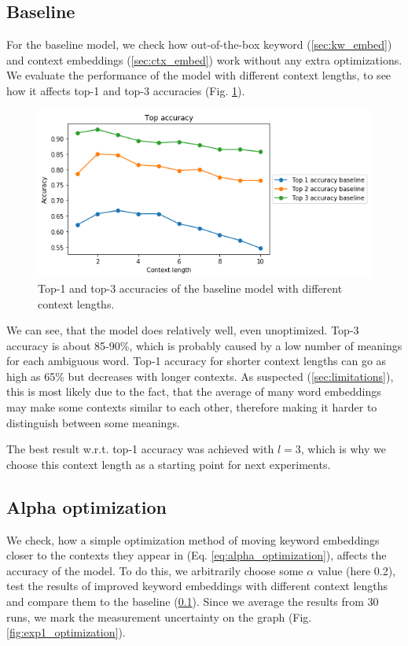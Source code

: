 \documentclass{llncs}
\begin{document}
\subsection{Baseline}
\label{sec:baseline}
For the baseline model, we check how out-of-the-box keyword (\ref{sec:kw_embed}) and context embeddings (\ref{sec:ctx_embed}) work without any extra optimizations.
We evaluate the performance of the model with different context lengths, to see how it affects top-1 and top-3 accuracies (Fig. \ref{fig:baseline}).

\begin{figure}
    \centering
    \caption{Top-1 and top-3 accuracies of the baseline model with different context lengths.}
    \label{fig:baseline}
    \includegraphics[scale=0.7]{res/baseline_context_top_acc.png}
\end{figure}

We can see, that the model does relatively well, even unoptimized.
Top-3 accuracy is about 85-90\%, which is probably caused by a low number of meanings for each ambiguous word.
Top-1 accuracy for shorter context lengths can go as high as 65\% but decreases with longer contexts.
As suspected (\ref{sec:limitations}), this is most likely due to the fact, that the average of many word embeddings may make some contexts similar to each other, therefore making it harder to distinguish between some meanings.

The best result w.r.t. top-1 accuracy was achieved with \(l=3\), which is why we choose this context length as a starting point for next experiments.

\subsection{Alpha optimization}
\label{sec:exp_alpha}
We check, how a simple optimization method of moving keyword embeddings closer to the contexts they appear in (Eq. \ref{eq:alpha_optimization}), affects the accuracy of the model.
To do this, we arbitrarily choose some \(\alpha\) value (here 0.2), test the results of improved keyword embeddings with different context lengths and compare them to the baseline (\ref{sec:baseline}). Since we average the results from 30 runs, we mark the measurement uncertainty on the graph (Fig. \ref{fig:exp1_optimization}).
\end{document}
